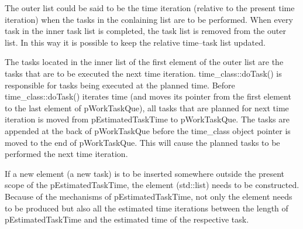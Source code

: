 	The outer list could be said to be the time iteration (relative to the present time iteration) when the tasks in the conlaining list are to be performed. 
	When every task in the inner task list is completed, %
		the task list is removed from the outer list. 
	In this way it is possible to keep the relative time--task list updated.

	The tasks located in the inner list of the first element of the outer list are the tasks that are to be executed the next time iteration.
	time\_class::doTask() is responsible for tasks being executed at the planned time. 
	Before time\_class::doTask() iterates time (and moves its pointer from the first element to the last element of pWorkTaskQue), all tasks that are planned for next time iteration is moved from pEstimatedTaskTime to pWorkTaskQue.
	The tasks are appended at the back of pWorkTaskQue before the time\_class object pointer is moved to the end of pWorkTaskQue. 
	This will cause the planned tasks to be performed the next time iteration.


	If a new element (a new task) is to be inserted somewhere outside the present scope of the pEstimatedTaskTime, the element (std::list) needs to be constructed.
	Because of the mechanisms of pEstimatedTaskTime, not only the element needs to be produced but also all the estimated time iterations between the length of pEstimatedTaskTime and the estimated time of the respective task.

	
